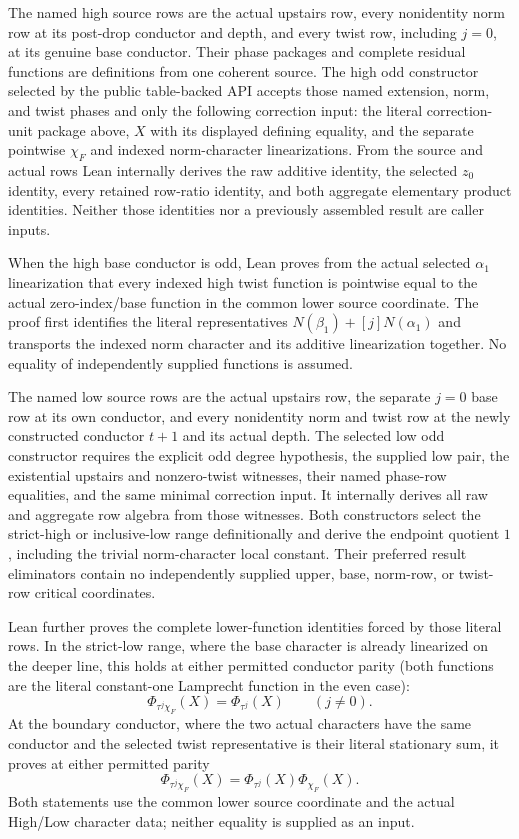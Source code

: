 \begin{definition}
The named high source rows are the actual upstairs row, every nonidentity
norm row at its post-drop conductor and depth, and every twist row, including
$j=0$, at its genuine base conductor.  Their phase packages and complete
residual functions are definitions from one coherent source.  The high odd
constructor selected by the public table-backed API accepts those named
extension, norm, and twist phases and only the following correction input:
the literal
correction-unit package above,
$X$ with its displayed defining equality, and the separate pointwise
$\chi_F$ and indexed norm-character linearizations.  From the source and
actual rows Lean internally derives the raw additive identity, the selected
$z_0$ identity, every retained row-ratio identity, and both aggregate
elementary product identities.  Neither those identities nor a previously
assembled result are caller inputs.

When the high base conductor is odd, Lean proves from the actual selected
$\alpha_1$ linearization that every indexed high twist function is pointwise
equal to the actual zero-index/base function in the common lower source
coordinate.  The proof first identifies the literal representatives
$N(\beta_1)+[j]N(\alpha_1)$ and transports the indexed norm character and
its additive linearization together.  No equality of independently supplied
functions is assumed.

The named low source rows are the actual upstairs row, the separate $j=0$
base row at its own conductor, and every nonidentity norm and twist row at
the newly constructed conductor $t+1$ and its actual depth.  The selected
low odd constructor requires the explicit odd degree hypothesis, the
supplied low pair, the existential upstairs and nonzero-twist witnesses,
their named phase-row equalities, and the same minimal correction input.  It
internally derives all raw and aggregate row algebra from those witnesses.
Both constructors select the strict-high or inclusive-low range
definitionally and derive the endpoint quotient $1$, including the trivial
norm-character local constant.  Their preferred result eliminators contain
no independently supplied upper, base, norm-row, or twist-row critical
coordinates.

Lean further proves the complete lower-function identities forced by those
literal rows.  In the strict-low range, where the base character is already
linearized on the deeper line, this holds at either permitted conductor
parity (both functions are the literal constant-one Lamprecht function in
the even case):
\[
  \Phi_{\tau^j\chi_F}(X)=\Phi_{\tau^j}(X)
  \qquad(j\ne0).
\]
At the boundary conductor, where the two actual characters have the same
conductor and the selected twist representative is their literal stationary
sum, it proves at either permitted parity
\[
  \Phi_{\tau^j\chi_F}(X)
    =\Phi_{\tau^j}(X)\Phi_{\chi_F}(X).
\]
Both statements use the common lower source coordinate and the actual
High/Low character data; neither equality is supplied as an input.


\end{definition}
